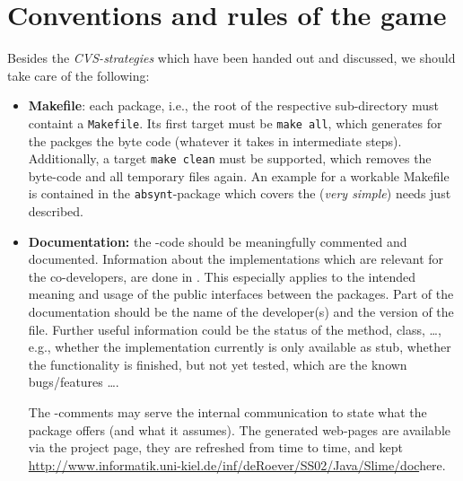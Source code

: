 


\section*{Conventions and rules of the game}
\label{sec:conventions}

Besides the \emph{CVS-strategies} which have been handed out and discussed,
we should take care of the following:

\begin{itemize}
\item \textbf{Makefile}: each package, i.e., the root of the respective
  sub-directory must containt a \texttt{Makefile}.  Its first target must
  be \texttt{make all}, which generates for the packges the \Java{} byte
  code (whatever it takes in intermediate steps).  Additionally, a target
  \texttt{make clean} must be supported, which removes the byte-code and
  all temporary files again.  An example for a workable Makefile is
  contained in the \texttt{absynt}-package which covers the (\emph{very
    simple}) needs just described.

  
\item \textbf{Documentation:} the \Java-code should be meaningfully
  commented and documented. Information about the implementations which are
  relevant for the co-developers, are done in \javadoc. This especially
  applies to the intended meaning and usage of the public interfaces
  between the packages. Part of the documentation should be the name of the
  developer(s) and the version of the file. Further useful information
  could be the status of the method, class, \ldots, e.g., whether the
  implementation currently is only available as stub, whether the
  functionality is finished, but not yet tested, which are the known
  bugs/features \ldots.
  
  The \javadoc-comments may serve the internal communication to state what
  the package offers (and what it assumes). The generated web-pages are
  available via the project page, they are refreshed from time to time, and
  kept
  \url{http://www.informatik.uni-kiel.de/inf/deRoever/SS02/Java/Slime/doc}{here}.
\end{itemize}



